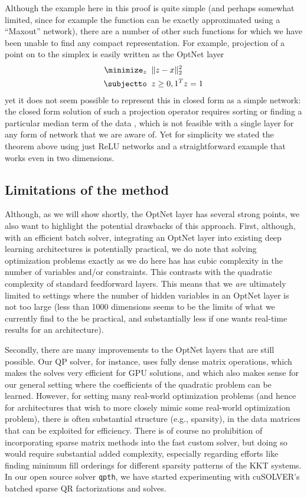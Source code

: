 Although the example here in this proof is quite simple (and perhaps somewhat
limited, since for example the function can be exactly approximated using a
``Maxout'' network), there are a number of other such functions for which we
have been unable to find any compact representation.  For example, projection of
a point on to the simplex is easily written as the OptNet layer
\begin{equation}
  \begin{split}
  \minimize_{z} \;\; & \|z - x\|_2^2 \\
  \subjectto \;\; & z \geq 0, 1^T z = 1
  \end{split}
\end{equation}
yet it does not seem possible to represent this in closed form as a simple
network: the closed form solution of such a projection operator requires sorting
or finding a particular median term of the data \cite{duchi2008efficient}, which
is not feasible
with a single layer for any form of network that we are aware of.  Yet for
simplicity we stated the theorem above using just ReLU networks and a
straightforward example that works even in two dimensions.

\subsection{Limitations of the method}
Although, as we will show shortly, the OptNet layer has several strong points,
we also want to highlight the potential drawbacks of this approach.
First, although, with an efficient batch solver, integrating an OptNet layer into
existing deep learning architectures is potentially practical, we do note that
solving optimization problems exactly as we do here has has cubic complexity in
the number of variables and/or constraints.  This contrasts with the quadratic
complexity of standard feedforward layers.  This means that we \emph{are}
ultimately limited to settings where the number of hidden variables in an OptNet
layer is not too large (less than 1000 dimensions seems to be the limits of what
we currently find to the be practical, and substantially less if one wants
real-time results for an architecture).

Secondly, there are many improvements to the OptNet layers that are still
possible.  Our QP solver, for instance, uses fully dense matrix operations,
which makes the solves very efficient for GPU solutions, and which also makes
sense for our general setting where the coefficients of the quadratic problem
can be learned.  However, for setting many real-world optimization problems
(and hence for architectures that wish to more closely mimic some real-world
optimization problem), there is often substantial structure (e.g., sparsity), in
the data matrices that can be exploited for efficiency.
There is of course no prohibition of incorporating sparse matrix methods into
the fast custom solver, but doing so would require substantial added complexity,
especially regarding efforts like finding minimum fill orderings for different
sparsity patterns of the KKT systems.
In our open source solver \verb!qpth!, we have started experimenting
with cuSOLVER's batched sparse QR factorizations and solves.

